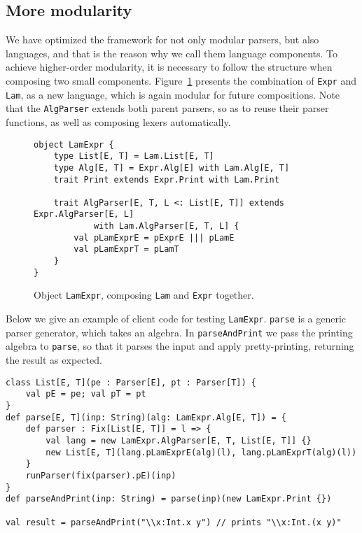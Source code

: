 \subsection{More modularity}



We have optimized the framework for not only modular parsers, but also languages, and that is the reason why we call them language components. To achieve
higher-order modularity, it is necessary to follow the structure when composing two small components. Figure~\ref{fig:objectlamexpr} presents the combination of \lstinline{Expr} and \lstinline{Lam}, as a new language, which is again modular for future compositions. Note that the \lstinline{AlgParser} extends both parent parsers, so as to reuse their parser functions, as well as composing lexers automatically.

\begin{figure}[htbp]
\centering
\begin{lstlisting}
object LamExpr {
    type List[E, T] = Lam.List[E, T]
    type Alg[E, T] = Expr.Alg[E] with Lam.Alg[E, T]
    trait Print extends Expr.Print with Lam.Print

    trait AlgParser[E, T, L <: List[E, T]] extends Expr.AlgParser[E, L]
            with Lam.AlgParser[E, T, L] {
        val pLamExprE = pExprE ||| pLamE
        val pLamExprT = pLamT
    }
}
\end{lstlisting}
\caption{Object \lstinline{LamExpr}, composing \lstinline{Lam} and \lstinline{Expr} together.}\label{fig:objectlamexpr}
\end{figure}

Below we give an example of client code for testing \lstinline{LamExpr}. \lstinline{parse} is a generic parser generator, which takes an algebra.
In \lstinline{parseAndPrint} we pass the printing algebra to \lstinline{parse}, so that it parses the input and apply pretty-printing, returning the result as expected.

\begin{lstlisting}
class List[E, T](pe : Parser[E], pt : Parser[T]) {
    val pE = pe; val pT = pt
}
def parse[E, T](inp: String)(alg: LamExpr.Alg[E, T]) = {
    def parser : Fix[List[E, T]] = l => {
        val lang = new LamExpr.AlgParser[E, T, List[E, T]] {}
        new List[E, T](lang.pLamExprE(alg)(l), lang.pLamExprT(alg)(l))
    }
    runParser(fix(parser).pE)(inp)
}
def parseAndPrint(inp: String) = parse(inp)(new LamExpr.Print {})

val result = parseAndPrint("\\x:Int.x y") // prints "\\x:Int.(x y)"
\end{lstlisting}
